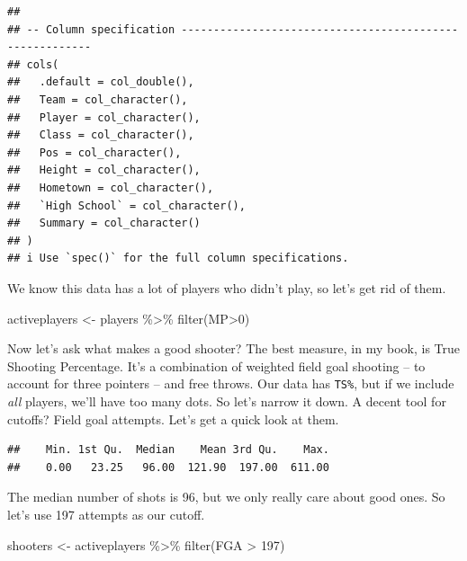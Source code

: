 \documentclass[
]{book}
\newenvironment{Shaded}{\begin{snugshade}}{\end{snugshade}}
\newcommand{\DecValTok}[1]{\textcolor[rgb]{0.00,0.00,0.81}{#1}}
\newcommand{\FunctionTok}[1]{\textcolor[rgb]{0.00,0.00,0.00}{#1}}
\newcommand{\NormalTok}[1]{#1}
\newcommand{\OtherTok}[1]{\textcolor[rgb]{0.56,0.35,0.01}{#1}}
\newcommand{\SpecialCharTok}[1]{\textcolor[rgb]{0.00,0.00,0.00}{#1}}
\begin{document}
\begin{verbatim}
## 
## -- Column specification --------------------------------------------------------
## cols(
##   .default = col_double(),
##   Team = col_character(),
##   Player = col_character(),
##   Class = col_character(),
##   Pos = col_character(),
##   Height = col_character(),
##   Hometown = col_character(),
##   `High School` = col_character(),
##   Summary = col_character()
## )
## i Use `spec()` for the full column specifications.
\end{verbatim}

We know this data has a lot of players who didn't play, so let's get rid of them.

\begin{Shaded}
\begin{Highlighting}[]
\NormalTok{activeplayers }\OtherTok{\textless{}{-}}\NormalTok{ players }\SpecialCharTok{\%\textgreater{}\%} \FunctionTok{filter}\NormalTok{(MP}\SpecialCharTok{\textgreater{}}\DecValTok{0}\NormalTok{) }
\end{Highlighting}
\end{Shaded}

Now let's ask what makes a good shooter? The best measure, in my book, is True Shooting Percentage. It's a combination of weighted field goal shooting -- to account for three pointers -- and free throws. Our data has \texttt{TS\%}, but if we include \emph{all} players, we'll have too many dots. So let's narrow it down. A decent tool for cutoffs? Field goal attempts. Let's get a quick look at them.

\begin{Shaded}
\end{Shaded}

\begin{verbatim}
##    Min. 1st Qu.  Median    Mean 3rd Qu.    Max. 
##    0.00   23.25   96.00  121.90  197.00  611.00
\end{verbatim}

The median number of shots is 96, but we only really care about good ones. So let's use 197 attempts as our cutoff.

\begin{Shaded}
\begin{Highlighting}[]
\NormalTok{shooters }\OtherTok{\textless{}{-}}\NormalTok{ activeplayers }\SpecialCharTok{\%\textgreater{}\%} \FunctionTok{filter}\NormalTok{(FGA }\SpecialCharTok{\textgreater{}} \DecValTok{197}\NormalTok{)}
\end{Highlighting}
\end{Shaded}
\end{document}
